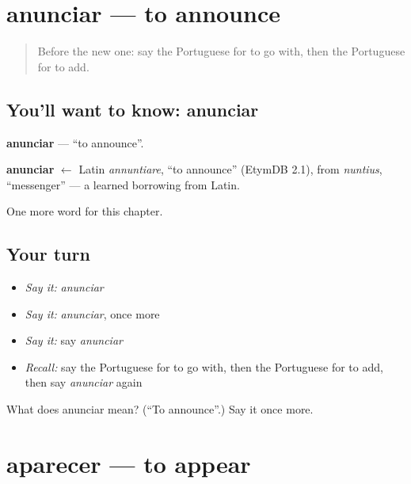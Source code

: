 \section[anunciar]{anunciar — to announce}

\label{lesson:PT-C141-anunciar}



\begin{quote}
Before the new one: say the Portuguese for to go with, then the Portuguese for to add.
\end{quote}

\subsection*{You'll want to know: anunciar}
\textbf{anunciar} — \textquotedblleft{}to announce\textquotedblright{}.

\begin{cousinweb}
\textbf{anunciar} $\leftarrow$ Latin \emph{annuntiare}, \textquotedblleft{}to announce\textquotedblright{} (EtymDB 2.1), from \emph{nuntius}, \textquotedblleft{}messenger\textquotedblright{} — a learned borrowing from Latin.
\end{cousinweb}

\begin{grammarlens}[title={What you've built}]
One more word for this chapter.
\end{grammarlens}

\subsection*{Your turn}
\begin{itemize}
\raggedright
  \item \emph{Say it:} \emph{anunciar}
  \item \emph{Say it:} \emph{anunciar}, once more
  \item \emph{Say it:} say \emph{anunciar}
  \item \emph{Recall:} say the Portuguese for to go with, then the Portuguese for to add, then say \emph{anunciar} again
\end{itemize}

\begin{tcolorbox}[breakable,colback=teal!4,colframe=teal!35!black,title={Before you move on}]
What does anunciar mean? (\textquotedblleft{}To announce\textquotedblright{}.) Say it once more.
\end{tcolorbox}
\section[aparecer]{aparecer — to appear}

